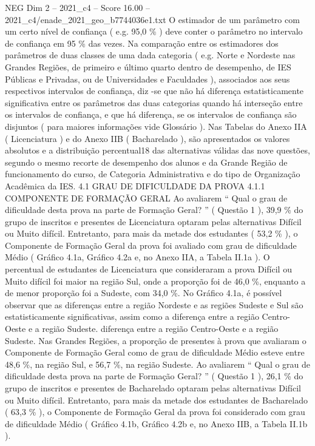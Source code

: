 \begin{textsample}{NEG Dim 2 – 2021\_c4 – Score 16.00 – 2021\_c4/enade\_2021\_geo\_b7744036e1.txt}
O estimador de um parâmetro com um certo nível de confiança ( e.g. 95,0 \% ) deve conter o parâmetro no intervalo de confiança em 95 \% das vezes.
Na comparação entre os estimadores dos parâmetros de duas classes de uma dada categoria ( e.g.
Norte e Nordeste nas Grandes Regiões, de primeiro e último quarto dentro de desempenho, de IES Públicas e Privadas, ou de Universidades e Faculdades ), associados aos seus respectivos intervalos de confiança, diz -se que não há diferença estatisticamente significativa entre os parâmetros das duas categorias quando há interseção entre os intervalos de confiança, e que há diferença, se os intervalos de confiança são disjuntos ( para maiores informações vide Glossário ).
Nas Tabelas do Anexo IIA ( Licenciatura ) e do Anexo IIB ( Bacharelado ), são apresentados os valores absolutos e a distribuição percentual18 das alternativas válidas das nove questões, segundo o mesmo recorte de desempenho dos alunos e da Grande Região de funcionamento do curso, de Categoria Administrativa e do tipo de Organização Acadêmica da IES. 4.1 GRAU DE DIFICULDADE DA PROVA 4.1.1 COMPONENTE DE FORMAÇÃO GERAL Ao avaliarem “ Qual o grau de dificuldade desta prova na parte de Formação Geral? ” ( Questão 1 ), 39,9 \% do grupo de inscritos e presentes de Licenciatura optaram pelas alternativas Difícil ou Muito difícil.
Entretanto, para mais da metade dos estudantes ( 53,2 \% ), o Componente de Formação Geral da prova foi avaliado com grau de dificuldade Médio ( Gráfico 4.1a, Gráfico 4.2a e, no Anexo IIA, a Tabela II.1a ).
O percentual de estudantes de Licenciatura que consideraram a prova Difícil ou Muito difícil foi maior na região Sul, onde a proporção foi de 46,0 \%, enquanto a de menor proporção foi a Sudeste, com 34,0 \%.
No Gráfico 4.1a, é possível observar que as diferenças entre a região Nordeste e as regiões Sudeste e Sul são estatisticamente significativas, assim como a diferença entre a região Centro-Oeste e a região Sudeste. diferença entre a região Centro-Oeste e a região Sudeste.
Nas Grandes Regiões, a proporção de presentes à prova que avaliaram o Componente de Formação Geral como de grau de dificuldade Médio esteve entre 48,6 \%, na região Sul, e 56,7 \%, na região Sudeste.
Ao avaliarem “ Qual o grau de dificuldade desta prova na parte de Formação Geral? ” ( Questão 1 ), 26,1 \% do grupo de inscritos e presentes de Bacharelado optaram pelas alternativas Difícil ou Muito difícil.
Entretanto, para mais da metade dos estudantes de Bacharelado ( 63,3 \% ), o Componente de Formação Geral da prova foi considerado com grau de dificuldade Médio ( Gráfico 4.1b, Gráfico 4.2b e, no Anexo IIB, a Tabela II.1b ).

\end{textsample}

